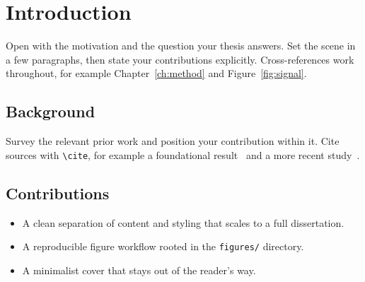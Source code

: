 \chapter{Introduction}
\label{ch:intro}
Open with the motivation and the question your thesis answers. Set the
scene in a few paragraphs, then state your contributions explicitly.
Cross-references work throughout, for example Chapter~\ref{ch:method} and
Figure~\ref{fig:signal}.

\section{Background}
Survey the relevant prior work and position your contribution within it.
Cite sources with \texttt{\textbackslash cite}, for example a foundational
result~\cite{ref:turing} and a more recent study~\cite{ref:attention}.

\section{Contributions}
\begin{itemize}
  \item A clean separation of content and styling that scales to a full
        dissertation.
  \item A reproducible figure workflow rooted in the \texttt{figures/}
        directory.
  \item A minimalist cover that stays out of the reader's way.
\end{itemize}
